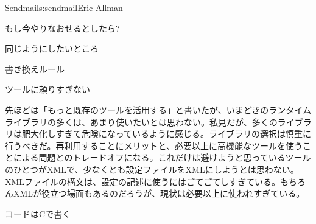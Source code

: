 \begin{aosachapter}{Sendmail}{s:sendmail}{Eric Allman}
\begin{aosasect1}{もし今やりなおせるとしたら?}
\begin{aosasect2}{同じようにしたいところ}
\begin{aosasect3}{書き換えルール}
\end{aosasect3}

\begin{aosasect3}{ツールに頼りすぎない}

先ほどは「もっと既存のツールを活用する」と書いたが、いまどきのランタイムライブラリの多くは、あまり使いたいとは思わない。私見だが、多くのライブラリは肥大化しすぎて危険になっているように感じる。ライブラリの選択は慎重に行うべきだ。再利用することにメリットと、必要以上に高機能なツールを使うことによる問題とのトレードオフになる。これだけは避けようと思っているツールのひとつがXMLで、少なくとも設定ファイルをXMLにしようとは思わない。XMLファイルの構文は、設定の記述に使うにはごてごてしすぎている。もちろんXMLが役立つ場面もあるのだろうが、現状は必要以上に使われすぎている。

\end{aosasect3}

\begin{aosasect3}{コードはCで書く}


\end{aosasect3}
\end{aosasect2}
\end{aosasect1}
\end{aosachapter}
